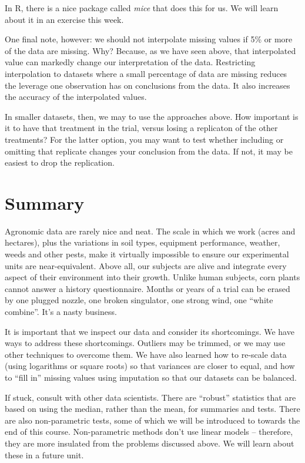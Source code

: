 \documentclass[
]{book}
\begin{document}
In R, there is a nice package called \emph{mice} that does this for us. We will learn about it in an exercise this week.

One final note, however: we should not interpolate missing values if 5\% or more of the data are missing. Why? Because, as we have seen above, that interpolated value can markedly change our interpretation of the data. Restricting interpolation to datasets where a small percentage of data are missing reduces the leverage one observation has on conclusions from the data. It also increases the accuracy of the interpolated values.

In smaller datasets, then, we may to use the approaches above. How important is it to have that treatment in the trial, versus losing a replicaton of the other treatments? For the latter option, you may want to test whether including or omitting that replicate changes your conclusion from the data. If not, it may be easiest to drop the replication.

\hypertarget{summary}{%
\section{Summary}\label{summary}}

Agronomic data are rarely nice and neat. The scale in which we work (acres and hectares), plus the variations in soil types, equipment performance, weather, weeds and other pests, make it virtually impossible to ensure our experimental units are near-equivalent. Above all, our subjects are alive and integrate every aspect of their environment into their growth. Unlike human subjects, corn plants cannot answer a history questionnaire. Months or years of a trial can be erased by one plugged nozzle, one broken singulator, one strong wind, one ``white combine''. It's a nasty business.

It is important that we inspect our data and consider its shortcomings. We have ways to address these shortcomings. Outliers may be trimmed, or we may use other techniques to overcome them. We have also learned how to re-scale data (using logarithms or square roots) so that variances are closer to equal, and how to ``fill in'' missing values using imputation so that our datasets can be balanced.

If stuck, consult with other data scientists. There are ``robust'' statistics that are based on using the median, rather than the mean, for summaries and tests. There are also non-parametric tests, some of which we will be introduced to towards the end of this course. Non-parametric methods don't use linear models -- therefore, they are more insulated from the problems discussed above. We will learn about these in a future unit.
\end{document}
